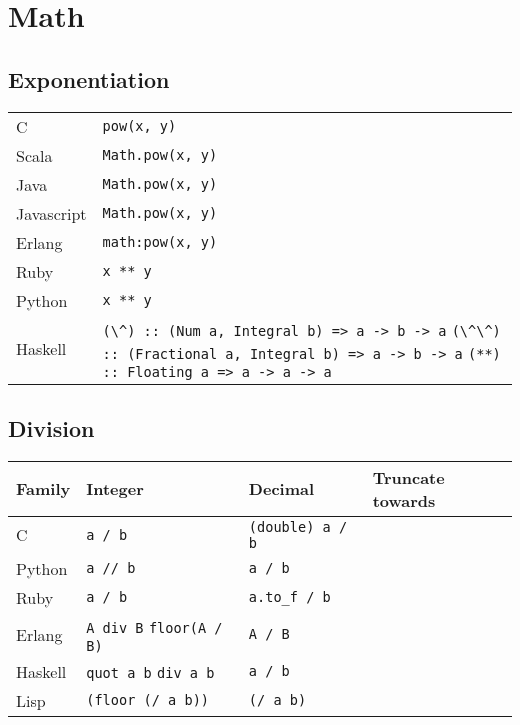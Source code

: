 \documentclass{article}
\begin{document}
\section{Math}
\subsection{Exponentiation}
\begin{longtabu} to 0.75\linewidth { X X }
	C & \lstinline$pow(x, y)$ \\
	Scala & \lstinline$Math.pow(x, y)$ \\
	Java & \lstinline$Math.pow(x, y)$ \\
	Javascript & \lstinline$Math.pow(x, y)$ \\
	Erlang & \lstinline$math:pow(x, y)$ \\
	Ruby & \lstinline$x ** y$ \\
	Python & \lstinline$x ** y$ \\
	Haskell & \lstinline$(\^) :: (Num a, Integral b) => a -> b -> a$ \newline \lstinline$(\^\^) :: (Fractional a, Integral b) => a -> b -> a$ \newline \lstinline$(**) :: Floating a => a -> a -> a$ \\
\end{longtabu}

\subsection{Division}
\begin{longtabu} to 0.75\linewidth { X X X X }
	Family & Integer & Decimal & Truncate towards \\
	\hline
	C & \lstinline$a / b$ & \lstinline$(double) a / b$ & \\
	Python & \lstinline$a // b$ & \lstinline$a / b$ & \\
	Ruby & \lstinline$a / b$ & \lstinline$a.to_f / b$ & \\
	Erlang & \lstinline$A div B$ \newline \lstinline$floor(A / B)$ & \lstinline$A / B$ & \\
	Haskell & \lstinline$quot a b$ \newline \lstinline$div a b$ & \lstinline$a / b$ & \\
	Lisp & \lstinline$(floor (/ a b))$ & \lstinline$(/ a b)$ & \\
\end{longtabu}
\end{document}
